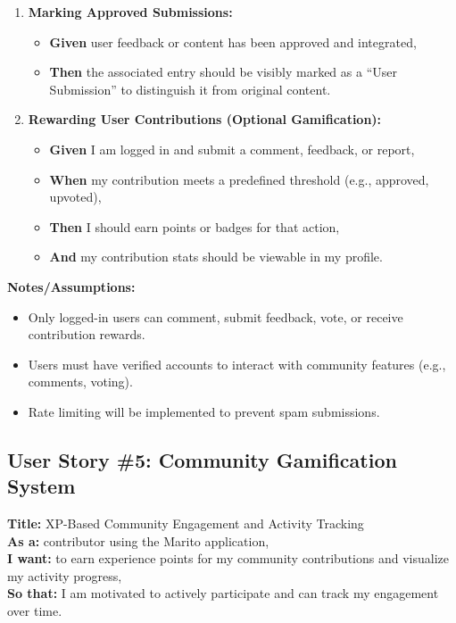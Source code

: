 \documentclass[12pt]{article}
\begin{document}
\begin{enumerate}
    \item \textbf{Marking Approved Submissions:}
    \begin{itemize}
        \item \textbf{Given} user feedback or content has been approved and integrated,
        \item \textbf{Then} the associated entry should be visibly marked as a ``User Submission'' to distinguish it from original content.
    \end{itemize}

    \item \textbf{Rewarding User Contributions (Optional Gamification):}
    \begin{itemize}
        \item \textbf{Given} I am logged in and submit a comment, feedback, or report,
        \item \textbf{When} my contribution meets a predefined threshold (e.g., approved, upvoted),
        \item \textbf{Then} I should earn points or badges for that action,
        \item \textbf{And} my contribution stats should be viewable in my profile.
    \end{itemize}
\end{enumerate}

\vspace{1em}
\textbf{Notes/Assumptions:}
\begin{itemize}
    \item Only logged-in users can comment, submit feedback, vote, or receive contribution rewards.
    \item Users must have verified accounts to interact with community features (e.g., comments, voting).
    \item Rate limiting will be implemented to prevent spam submissions.
\end{itemize}

\subsection{User Story \#5: Community Gamification System}

\textbf{Title:} XP-Based Community Engagement and Activity Tracking \\
\textbf{As a:} contributor using the Marito application, \\
\textbf{I want:} to earn experience points for my community contributions and visualize my activity progress, \\
\textbf{So that:} I am motivated to actively participate and can track my engagement over time.
\end{document}
